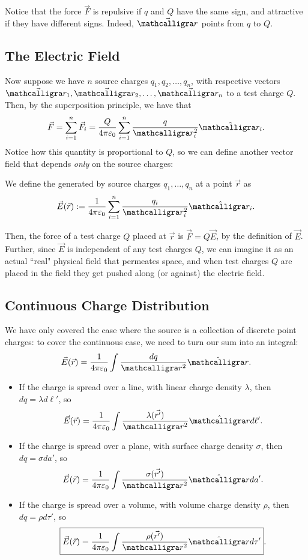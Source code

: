 Notice that the force $\vec{F}$ is repulsive if $q$ and $Q$ have the same sign, and attractive if they have different signs. Indeed, $\vec{\scr}$ points from $q$ to $Q$.

\subsection{The Electric Field}

Now suppose we have $n$ source charges $q_1,q_2,\dots,q_n$, with respective vectors $\vec{\scr_1},\vec{\scr_2},\dots,\vec{\scr_n}$ to a test charge $Q$. Then, by the superposition principle, we have that
\[\vec{F}=\sum_{i=1}^n\vec{F}_i=\frac{Q}{4\pi\varepsilon_0}\sum_{i=1}^n\frac{q}{\scr_i^2}\hat{\scr_i}.\]
Notice how this quantity is proportional to $Q$, so we can define another vector field that depends \textit{only} on the source charges:
\begin{definition}
We define the  generated by source charges $q_1,\dots,q_n$ at a point $\vec{r}$ as
\[\vec{E}(\vec{r}):=\frac{1}{4\pi\varepsilon_0}\sum_{i=1}^n\frac{q_i}{\scr_i^2}\hat{\scr_i}.\]
\end{definition}
Then, the force of a test charge $Q$ placed at $\vec{r}$ is $\vec{F}=Q\vec{E}$, by the definition of $\vec{E}$. Further, since $\vec{E}$ is independent of any test charges $Q$, we can imagine it as an actual ``real" physical field that permeates space, and when test charges $Q$ are placed in the field they get pushed along (or against) the electric field.

\subsection{Continuous Charge Distribution}\label{contchardist}

We have only covered the case where the source is a collection of discrete point charges: to cover the continuous case, we need to turn our sum into an integral:
\[\vec{E}(\vec{r})=\frac{1}{4\pi\varepsilon_0}\int \frac{dq}{\scr^2}\hat{\scr}.\]
\begin{itemize}
    \item If the charge is spread over a line, with linear charge density $\lambda$, then $dq=\lambda d\ell'$, so
    \[\vec{E}(\vec{r})=\frac{1}{4\pi\varepsilon_0}
    \int\frac{\lambda(\vec{r'})}{\scr^2}\hat{\scr}d\ell'.\]
    \item If the charge is spread over a plane, with surface charge density $\sigma$, then $dq=\sigma da'$, so
    \[\vec{E}(\vec{r})=\frac{1}{4\pi\varepsilon_0}\int\frac{\sigma(\vec{r'})}{\scr^2}\hat{\scr}da'.\]
    \item If the charge is spread over a volume, with volume charge density $\rho$, then $dq=\rho d\tau'$, so
    \[\boxed{\vec{E}(\vec{r})=\frac{1}{4\pi\varepsilon_0}\int\frac{\rho(\vec{r'})}{\scr^2}\hat{\scr}d\tau'}.\]
\end{itemize}

